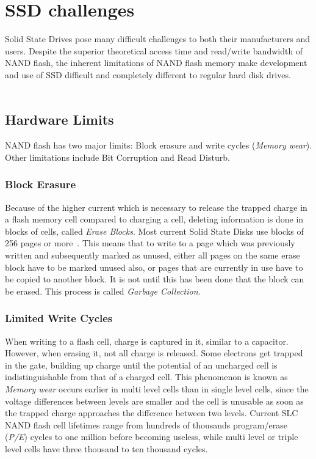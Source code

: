 \documentclass{acm_proc_article-sp}
\begin{document}
\section{SSD challenges}
Solid State Drives pose many difficult challenges to both their manufacturers and users. Despite the superior theoretical access time and read/write bandwidth of NAND flash, the inherent limitations of NAND flash memory make development and use of SSD difficult and completely different to regular hard disk drives.
\\
\\
\subsection{Hardware Limits}
NAND flash has two major limits: Block erasure and write cycles (\emph{Memory wear}). Other limitations include Bit Corruption and Read Disturb.

\subsubsection*{Block Erasure}
Because of the higher current which is necessary to release the trapped charge in a flash memory cell compared to charging a cell, deleting information is done in blocks of cells, called \emph{Erase Blocks}. Most current Solid State Disks use blocks of 256 pages or more~\cite{codecapsule2014coding}.
This means that to write to a page which was previously written and subsequently marked as unused, either all pages on the same erase block have to be marked unused also, or pages that are currently in use have to be copied to another block. It is not until this has been done that the block can be erased. This process is called \emph{Garbage Collection}.

\subsubsection*{Limited Write Cycles}
When writing to a flash cell, charge is captured in it, similar to a capacitor.
However, when erasing it, not all charge is released. Some electrons get trapped in the gate, building up charge until the potential of an uncharged cell is indistinguishable from that of a charged cell. This phenomenon is known as \emph{Memory wear} occurs earlier in multi level cells than in single level cells, since the voltage differences between levels are smaller and the cell is unusable as soon as the trapped charge approaches the difference between two levels.
Current SLC NAND flash cell lifetimes range from hundreds of thousands program/erase (\emph{P/E}) cycles to one million before becoming useless, while multi level or triple level cells have three thousand to ten thousand cycles.
\end{document}
